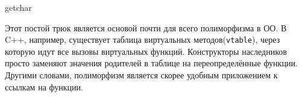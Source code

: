 \begin{code}
	
   \caption{getchar}
   \label{fake:polymorphism:getchar}
\end{code}

Этот постой трюк является основой почти для всего полиморфизма в ОО. В C++, например, существует таблица виртуальных методов(\texttt{vtable}), через которую идут все вызовы виртуальных функций. Конструкторы наследников просто заменяют значения родителей в таблице на переопределённые функции. Другими словами, полиморфизм является скорее удобным приложением к ссылкам на функции.

